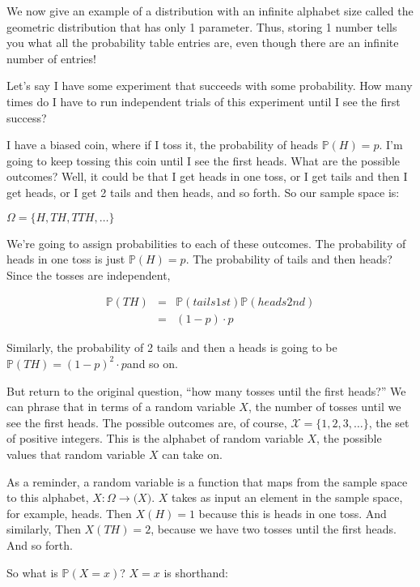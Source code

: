 \documentclass[6008notes.tex]{subfiles}
\begin{document}
We now give an example of a distribution with an infinite alphabet size called the geometric distribution that has only 1 parameter. Thus, storing 1 number tells you what all the probability table entries are, even though there are an infinite number of entries!

Let's say I have some experiment that succeeds with some probability. How many times do I have to run independent trials of this experiment until I see the first success? 

I have a biased coin, where if I toss it, the probability of heads $\mathbb{P}(H) = p$. I'm going to keep tossing this coin until I see the first heads. What are the possible outcomes? Well, it could be that I get heads in one toss, or I get tails and then I get heads, or I get 2 tails and then heads, and so forth. So our sample space is:

{\centering$\Omega = \{ H, TH, TTH, \dots \}$ \par}

We're going to assign probabilities to each of these outcomes. The probability of heads in one toss is just $\mathbb{P}(H) = p$. The probability of tails and then heads? Since the tosses are independent,

\begin{eqnarray*}
\mathbb{P}(TH) &=& \mathbb{P}(tails 1st)\mathbb{P}(heads 2nd) \\
							 &=& (1-p) \cdot p
\end{eqnarray*}

Similarly, the probability of 2 tails and then a heads is going to be $\mathbb{P}(TH) = (1-p)^2 \cdot p$and so on.

But return to the original question, ``how many tosses until the first heads?'' We can phrase that in terms of a random variable $X$, the number of tosses until we see the first heads. The possible outcomes are, of course, $\mathcal{X} = \{1, 2, 3, \dots \}$, the set of positive integers. This is the alphabet of random variable $X$, the possible values that random variable $X$ can take on. 

As a reminder, a random variable is a function that maps from the sample space to this alphabet, $X: \Omega \rightarrow \mathcal(X)$. $X$ takes as input an element in the sample space, for example, heads. Then $X(H) = 1$ because this is heads in one toss. And similarly, Then $X(TH) = 2$, because we have two tosses until the first heads. And so forth. 

So what is $\mathbb{P}(X = x)$? $X = x$ is shorthand: 
\end{document}
